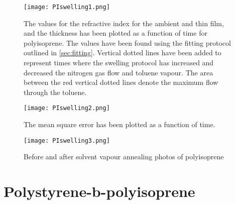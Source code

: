 \documentclass[MasterThesisMain.tex]{subfiles}
\begin{document}
\begin{figure}[H]
\centering
\texttt{[image: PIswelling1.png]}
\caption{The values for the refractive index for the ambient and thin film, and the thickness has been plotted as a function of time for polyisoprene. The values have been found using the fitting protocol outlined in \ref{sec:fitting}. Vertical dotted lines have been added to represent times where the swelling protocol has increased and decreased the nitrogen gas flow and toluene vapour. The area between the red vertical dotted lines denote the maximum flow through the toluene.}
\label{fig:PIswelling1}
\end{figure}

\begin{figure}[H]
\centering
\texttt{[image: PIswelling2.png]}
\caption{The mean square error has been plotted as a function of time.}
\label{fig:PIswelling2}
\end{figure}

\begin{figure}[H]
\centering
\texttt{[image: PIswelling3.png]}
\caption{}
\label{fig:PIswelling3}
\end{figure}

\begin{figure}
\centering     
{}
\caption{Before and after solvent vapour annealing photos of polyisoprene}
\end{figure}
	
\section{Polystyrene-b-polyisoprene}
\end{document}
